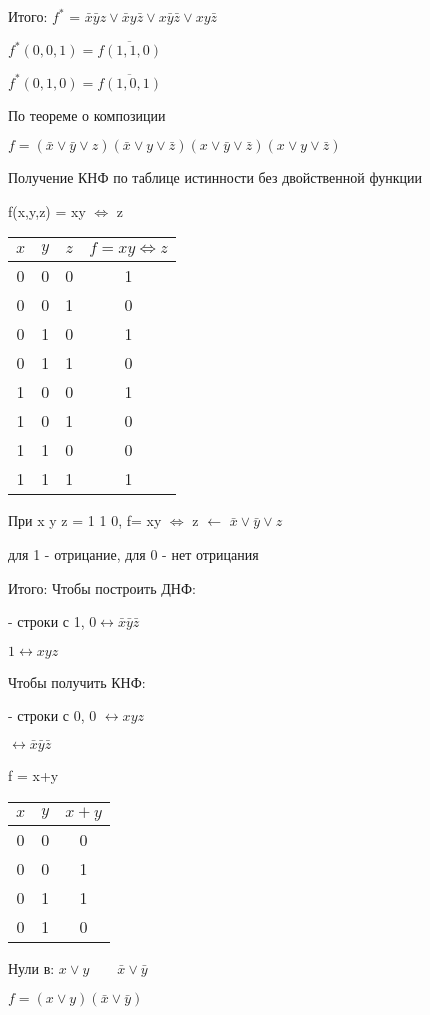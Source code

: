 \documentclass[russian]{lecture-notes}
\begin{document}
	Итого: $f^{*}$ = $\bar{x}\bar{y}z \vee \bar{x}y\bar{z} \vee x\bar{y}\bar{z} \vee xy\bar{z}$

	$f^{*}(0,0,1) = \overline{f(1,1,0)}$

	$f^{*}(0,1,0) = \overline{f(1,0,1)}$

	По теореме о композиции

	$f = (\bar{x} \vee \bar{y} \vee z)(\bar{x} \vee y \vee \bar{z})(x \vee \bar{y} \vee \bar{z})(x \vee y \vee \bar{z})$

	Получение КНФ по таблице истинности без двойственной функции

f(x,y,z) = xy $\Leftrightarrow$ z

	\begin{table}[h!]
	\centering
	\begin{tabular}{|c|c|c|c|}
		\hline
		$x$ & $y$ & $z$ & $f = xy \Leftrightarrow z $\\ \hline
		0 & 0 & 0 	& 1  \\ \hline
		0 & 0 & 1 	& 0  \\ \hline
		0 & 1 & 0 	& 1  \\ \hline
		0 & 1 & 1 	& 0  \\ \hline
		1 & 0 & 0 	& 1  \\ \hline
		1 & 0 & 1 	& 0  \\ \hline
		1 & 1 & 0 	& 0  \\ \hline
		1 & 1 & 1 	& 1  \\ \hline
	\end{tabular}
\end{table}


		При x y z = 1 1 0, f= xy $\Leftrightarrow$ z $\leftarrow$ $\bar{x}\lor\bar{y}\lor z$

	для 1 - отрицание, для 0 - нет отрицания

	Итого: Чтобы построить ДНФ:

	- строки с 1, $0 \leftrightarrow \bar{x}\bar{y}\bar{z}$

	\qquad \qquad \qquad $1 \leftrightarrow xyz$

	Чтобы получить КНФ:

	- строки с 0, 0 $\leftrightarrow xyz$

	\qquad \qquad {} $\leftrightarrow \bar{x}\bar{y}\bar{z}$

	\begin{example}
	f = x+y

	\begin{table}[h!]
	\centering
	\begin{tabular}{|c|c|c|}
		\hline
		$x$ & $y$ & $x+y$ \\ \hline
		0 & 0 & 0 \\ \hline
		0 & 0 & 1 \\ \hline
		0 & 1 & 1 \\ \hline
		0 & 1 & 0 \\ \hline
	\end{tabular}
\end{table}


	Нули в: $x \lor y \qquad \bar{x} \lor \bar{y}$

	$f = (x\lor y)(\bar{x} \lor \bar{y})$



\end{example}
\end{document}
